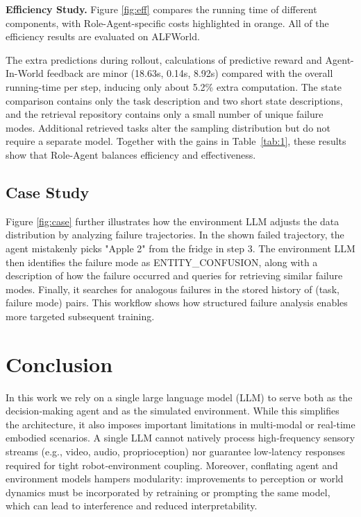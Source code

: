 \documentclass{llmxive}
\begin{document}
\noindent\textbf{Efficiency Study.} Figure \ref{fig:eff} compares the running time of different components, with Role-Agent-specific costs highlighted in orange. All of the efficiency results are evaluated on ALFWorld.

The extra predictions during rollout, calculations of predictive reward and Agent-In-World feedback are  minor (18.63s, 0.14s, 8.92s) compared with the overall running-time per step, inducing only about 5.2\% extra computation. The state comparison contains only the task description and two short state descriptions, and the retrieval repository contains only a small number of unique failure modes. Additional retrieved tasks alter the sampling distribution but do not require a separate model. Together with the gains in Table~\ref{tab:1}, these results show that Role-Agent balances efficiency and effectiveness. 
 


\subsection{Case Study}
Figure \ref{fig:case} further illustrates how the environment LLM adjusts the data distribution by analyzing failure trajectories. In the shown failed trajectory, the agent mistakenly picks "Apple 2" from the fridge in step 3. The environment LLM then identifies the failure mode as ENTITY\_CONFUSION, along with a description of how the failure occurred and queries for retrieving similar failure modes. Finally, it searches for analogous failures in the stored history of (task, failure mode) pairs. This workflow shows how structured failure analysis enables more targeted subsequent training.
 
\section{Conclusion}

In this work we rely on a single large language model (LLM) to serve both as the decision‑making agent and as the simulated environment. While this simplifies the architecture, it also imposes important limitations in multi‑modal or real‑time embodied scenarios. A single LLM cannot natively process high‑frequency sensory streams (e.g., video, audio, proprioception) nor guarantee low‑latency responses required for tight robot‑environment coupling. Moreover, conflating agent and environment models hampers modularity: improvements to perception or world dynamics must be incorporated by retraining or prompting the same model, which can lead to interference and reduced interpretability.
\end{document}
